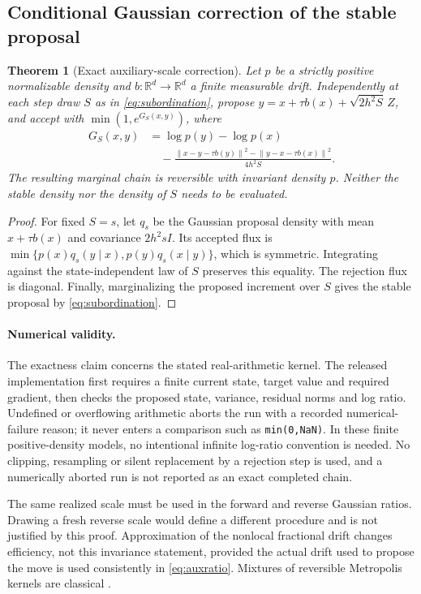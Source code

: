 \documentclass[pdflatex,iicol,sn-mathphys-ay]{sn-jnl}
\newtheorem{theorem}{Theorem}[section]
\theoremstyle{definition}\newtheorem{definition}[theorem]{Definition}
\theoremstyle{remark}\newtheorem{remark}[theorem]{Remark}
\numberwithin{equation}{section}
\newcommand{\R}{\mathbb R}\newcommand{\E}{\mathbb E}\newcommand{\Prob}{\mathbb P}
\newcommand{\norm}[1]{\left\lVert#1\right\rVert}\newcommand{\TV}{\mathrm{TV}}
\newcommand{\1}{\mathbf 1}
\begin{document}
\subsection{Conditional Gaussian correction of the stable proposal}
\begin{theorem}[Exact auxiliary-scale correction]\label{thm:auxiliary}
Let $p$ be a strictly positive normalizable density and $b:\R^d\to\R^d$ a finite measurable drift. Independently at each step draw $S$ as in \eqref{eq:subordination}, propose $y=x+\tau b(x)+\sqrt{2h^2S}\,Z$, and accept with $\min(1,e^{G_S(x,y)})$, where
\begin{equation}
\begin{aligned}
G_S(x,y)&=\log p(y)-\log p(x)\\
&\quad-\frac{\norm{x-y-\tau b(y)}^2-\norm{y-x-\tau b(x)}^2}{4h^2S}.
\end{aligned}\label{eq:auxratio}
\end{equation}
The resulting marginal chain is reversible with invariant density $p$. Neither the stable density nor the density of $S$ needs to be evaluated.
\end{theorem}
\begin{proof}
For fixed $S=s$, let $q_s$ be the Gaussian proposal density with mean $x+\tau b(x)$ and covariance $2h^2sI$. Its accepted flux is
$\min\{p(x)q_s(y\mid x),p(y)q_s(x\mid y)\}$, which is symmetric. Integrating against the state-independent law of $S$ preserves this equality. The rejection flux is diagonal. Finally, marginalizing the proposed increment over $S$ gives the stable proposal by \eqref{eq:subordination}.
\end{proof}
\paragraph{Numerical validity.} The exactness claim concerns the stated real-arithmetic kernel. The released implementation first requires a finite current state, target value and required gradient, then checks the proposed state, variance, residual norms and log ratio. Undefined or overflowing arithmetic aborts the run with a recorded numerical-failure reason; it never enters a comparison such as \texttt{min(0,NaN)}. In these finite positive-density models, no intentional infinite log-ratio convention is needed. No clipping, resampling or silent replacement by a rejection step is used, and a numerically aborted run is not reported as an exact completed chain.

The same realized scale must be used in the forward and reverse Gaussian ratios. Drawing a fresh reverse scale would define a different procedure and is not justified by this proof. Approximation of the nonlocal fractional drift changes efficiency, not this invariance statement, provided the actual drift used to propose the move is used consistently in \eqref{eq:auxratio}. Mixtures of reversible Metropolis kernels are classical \citep{tierney}.
\end{document}
